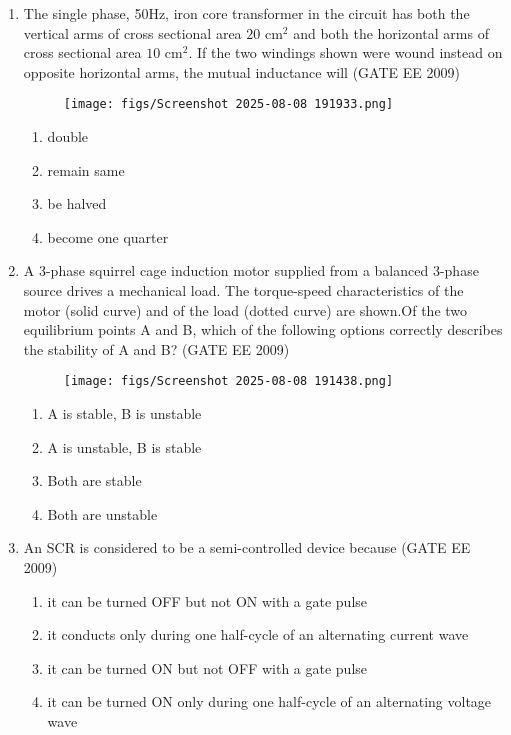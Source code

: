 \documentclass[journal,12pt,onecolumn]{IEEEtran}
\theoremstyle{remark}
\begin{document}
\begin{flushleft}
\begin{enumerate}
\item The single phase, 50Hz, iron core transformer in the circuit has both the vertical arms of cross sectional area $20\text{ cm}^2$ and both the horizontal arms of cross sectional area $10\text{ cm}^2$. If the two windings shown were wound instead on opposite horizontal arms, the mutual inductance will
\hfill(GATE EE 2009)
\begin{figure}[h]
    \centering
    \texttt{[image: figs/Screenshot 2025-08-08 191933.png]}
    \caption{}
    \label{fig:placeholder}
\end{figure}

\begin{enumerate}
    \item double
     \item remain same
     \item be halved
     \item become one quarter
\end{enumerate}


\item A 3-phase squirrel cage induction motor supplied from a balanced 3-phase source drives a mechanical load. The torque-speed characteristics of the motor (solid curve) and of the load (dotted curve) are shown.Of the two equilibrium points A and B, which of the following options correctly describes the stability of A and B?
\hfill(GATE EE 2009)
\begin{figure}[h!]
    \centering
    \texttt{[image: figs/Screenshot 2025-08-08 191438.png]}
    \caption{}
    \label{fig:placeholder}
\end{figure}

\begin{enumerate}
    \item A is stable, B is unstable
    \item A is unstable, B is stable
    \item Both are stable
    \item Both are unstable
\end{enumerate}


\item An SCR is considered to be a semi-controlled device because
\hfill(GATE EE 2009)
\begin{enumerate}
    \item it can be turned OFF but not ON with a gate pulse
    \item it conducts only during one half-cycle of an alternating current wave
    \item it can be turned ON but not OFF with a gate pulse
    \item it can be turned ON only during one half-cycle of an alternating voltage wave
\end{enumerate}



\end{enumerate}
\end{flushleft}
\end{document}
